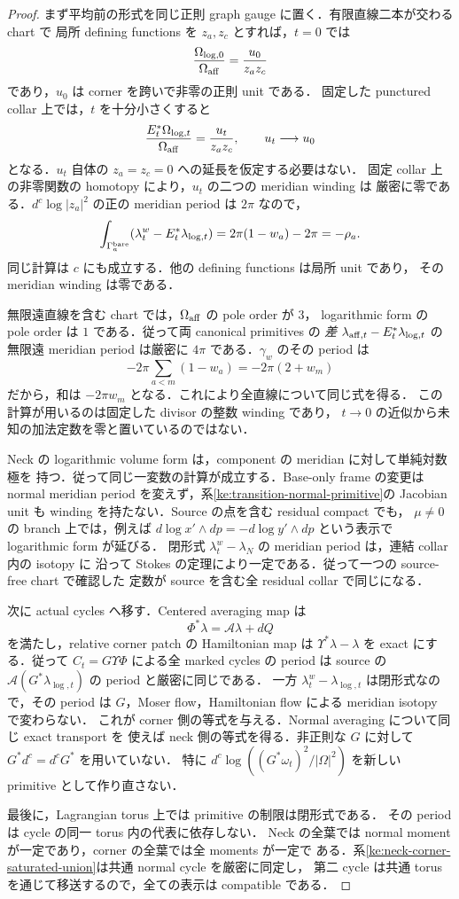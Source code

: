 \begin{proof}
まず平均前の形式を同じ正則 graph gauge に置く．有限直線二本が交わる chart で
局所 defining functions を $z_a,z_c$ とすれば，$t=0$ では
\[
 \frac{\Omega_{\log,0}}{\Omega_{\rm aff}}
   =\frac{u_0}{z_az_c}
\]
であり，$u_0$ は corner を跨いで非零の正則 unit である．
固定した punctured collar 上では，$t$ を十分小さくすると
\[
 \frac{E_t^*\Omega_{\log,t}}{\Omega_{\rm aff}}
   =\frac{u_t}{z_az_c},\qquad u_t\longrightarrow u_0
\]
となる．$u_t$ 自体の $z_a=z_c=0$ への延長を仮定する必要はない．
固定 collar 上の非零関数の homotopy により，$u_t$ の二つの meridian winding は
厳密に零である．$d^c\log|z_a|^2$ の正の meridian period は $2\pi$ なので，
\[
 \int_{\Gamma_a^{\rm bare}}(\lambda_t^w-E_t^*\lambda_{\log,t})
 =2\pi(1-w_a)-2\pi=-\rho_a .
\]
同じ計算は $c$ にも成立する．他の defining functions は局所 unit であり，
その meridian winding は零である．

無限遠直線を含む chart では，$\Omega_{\rm aff}$ の pole order が $3$，
logarithmic form の pole order は $1$ である．従って両 canonical primitives の
\emph{差} $\lambda_{{\rm aff},t}-E_t^*\lambda_{\log,t}$ の無限遠 meridian period
は厳密に $4\pi$ である．$\gamma_w$ のその period は
\[
 -2\pi\sum_{a<m}(1-w_a)=-2\pi(2+w_m)
\]
だから，和は $-2\pi w_m$ となる．これにより全直線について同じ式を得る．
この計算が用いるのは固定した divisor の整数 winding であり，
$t\to0$ の近似から未知の加法定数を零と置いているのではない．

Neck の logarithmic volume form は，component の meridian に対して単純対数極を
持つ．従って同じ一変数の計算が成立する．Base-only frame の変更は normal
meridian period を変えず，系\ref{ke:transition-normal-primitive}の Jacobian unit
も winding を持たない．Source の点を含む residual compact でも，
$\mu\ne0$ の branch 上では，例えば
$d\log x'\wedge dp=-d\log y'\wedge dp$ という表示で logarithmic form が延びる．
閉形式 $\lambda_t^w-\lambda_N$ の meridian period は，連結 collar 内の isotopy に
沿って Stokes の定理により一定である．従って一つの source-free chart で確認した
定数が source を含む全 residual collar で同じになる．

次に actual cycles へ移す．Centered averaging map は
\[
 \Phi^*\lambda=\mathcal A\lambda+dQ
\]
を満たし，relative corner patch の Hamiltonian map は
$\Upsilon^*\lambda-\lambda$ を exact にする．従って
$C_t=G\Upsilon\Phi$ による全 marked cycles の period は source の
$\mathcal A(G^*\lambda_{\log,t})$ の period と厳密に同じである．
一方 $\lambda_t^w-\lambda_{\log,t}$ は閉形式なので，その period は
$G$，Moser flow，Hamiltonian flow による meridian isotopy で変わらない．
これが corner 側の等式を与える．Normal averaging について同じ exact transport を
使えば neck 側の等式を得る．非正則な $G$ に対して $G^*d^c=d^cG^*$ を用いていない．
特に $d^c\log((G^*\omega_t)^2/|\Omega|^2)$ を新しい primitive として作り直さない．

最後に，Lagrangian torus 上では primitive の制限は閉形式である．
その period は cycle の同一 torus 内の代表に依存しない．
Neck の全葉では normal moment が一定であり，corner の全葉では全 moments が一定で
ある．系\ref{ke:neck-corner-saturated-union}は共通 normal cycle を厳密に同定し，
第二 cycle は共通 torus を通じて移送するので，全ての表示は compatible である．
\end{proof}

